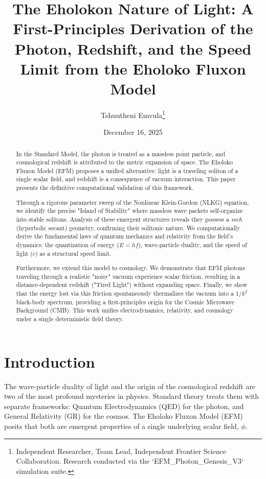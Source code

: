 \documentclass[11pt, twoside]{article}
\title{The Eholokon Nature of Light: A First-Principles Derivation of the Photon, Redshift, and the Speed Limit from the Eholoko Fluxon Model}
\author{Tshuutheni Emvula\thanks{Independent Researcher, Team Lead, Independent Frontier Science Collaboration. Research conducted via the `EFM_Photon_Genesis_V3` simulation suite.}}
\date{December 16, 2025}
\begin{document}
\maketitle
\thispagestyle{empty}

\begin{abstract}
In the Standard Model, the photon is treated as a massless point particle, and cosmological redshift is attributed to the metric expansion of space. The Eholoko Fluxon Model (EFM) proposes a unified alternative: light is a traveling soliton of a single scalar field, and redshift is a consequence of vacuum interaction. This paper presents the definitive computational validation of this framework.

Through a rigorous parameter sweep of the Nonlinear Klein-Gordon (NLKG) equation, we identify the precise "Island of Stability" where massless wave packets self-organize into stable solitons. Analysis of these emergent structures reveals they possess a \textit{sech} (hyperbolic secant) geometry, confirming their solitonic nature. We computationally derive the fundamental laws of quantum mechanics and relativity from the field's dynamics: the quantization of energy ($E=hf$), wave-particle duality, and the speed of light ($c$) as a structural speed limit.

Furthermore, we extend this model to cosmology. We demonstrate that EFM photons traveling through a realistic "noisy" vacuum experience scalar friction, resulting in a distance-dependent redshift ("Tired Light") without expanding space. Finally, we show that the energy lost via this friction spontaneously thermalizes the vacuum into a $1/k^2$ black-body spectrum, providing a first-principles origin for the Cosmic Microwave Background (CMB). This work unifies electrodynamics, relativity, and cosmology under a single deterministic field theory.
\end{abstract}

\clearpage
\tableofcontents
\clearpage

\section{Introduction}
The wave-particle duality of light and the origin of the cosmological redshift are two of the most profound mysteries in physics. Standard theory treats them with separate frameworks: Quantum Electrodynamics (QED) for the photon, and General Relativity (GR) for the cosmos. The Eholoko Fluxon Model (EFM) posits that both are emergent properties of a single underlying scalar field, $\phi$.
\end{document}
